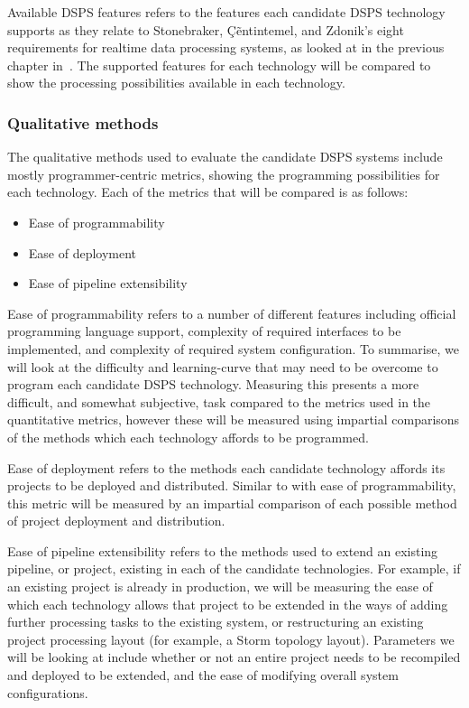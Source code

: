Available DSPS features refers to the features each candidate DSPS technology supports as they relate to Stonebraker,
\c{C}\~entintemel, and Zdonik's eight requirements for realtime data processing systems, as looked at in the previous
chapter in~. The supported features for each technology will be compared to show the
processing possibilities available in each technology.



\subsubsection{Qualitative methods} %
\label{ssub:qualitative_methods}

The qualitative methods used to evaluate the candidate DSPS systems include mostly programmer-centric metrics, showing the
programming possibilities for each technology. Each of the metrics that will be compared is as follows:

\begin{itemize}
  \item Ease of programmability
  \item Ease of deployment
  \item Ease of pipeline extensibility
\end{itemize}

Ease of programmability refers to a number of different features including official programming language support, complexity
of required interfaces to be implemented, and complexity of required system configuration. To summarise, we will look at
the difficulty and learning-curve that may need to be overcome to program each candidate DSPS technology. Measuring this
presents a more difficult, and somewhat subjective, task compared to the metrics used in the quantitative metrics, however
these will be measured using impartial comparisons of the methods which each technology affords to be programmed.

Ease of deployment refers to the methods each candidate technology affords its projects to be deployed and distributed.
Similar to with ease of programmability, this metric will be measured by an impartial comparison of each possible
method of project deployment and distribution.

Ease of pipeline extensibility refers to the methods used to extend an existing pipeline, or project, existing in each
of the candidate technologies. For example, if an existing project is already in production, we will be measuring the
ease of which each technology allows that project to be extended in the ways of adding further processing tasks to the
existing system, or restructuring an existing project processing layout (for example, a Storm topology layout). Parameters
we will be looking at include whether or not an entire project needs to be recompiled and deployed to be extended, and the
ease of modifying overall system configurations.

